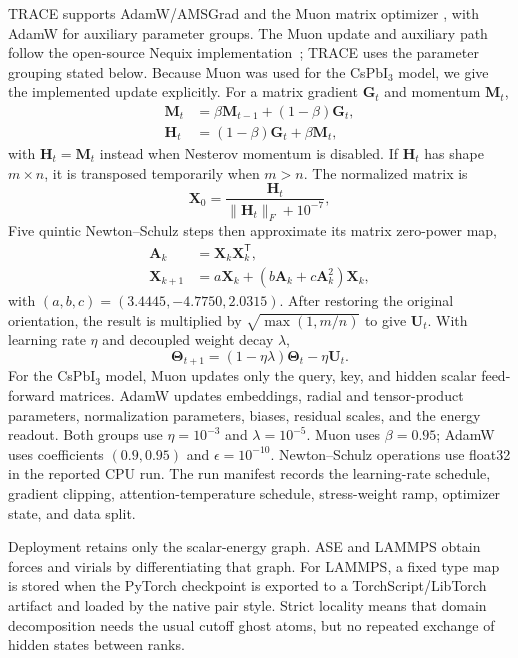 \documentclass[aps,prx,preprint,notitlepage,superscriptaddress,nofootinbib,floatfix]{revtex4-2}
\newcommand{\vect}[1]{\bm{#1}}
\begin{document}
TRACE supports AdamW/AMSGrad and the Muon matrix optimizer
\cite{jordan2024muon}, with AdamW for auxiliary parameter groups. The Muon
update and auxiliary path follow the open-source Nequix implementation~\cite{koker2025nequix}; TRACE uses the parameter grouping stated below. Because Muon was used for the CsPbI$_3$ model, we give
the implemented update explicitly. For a matrix gradient $\vect G_t$ and
momentum $\vect M_t$,
\begin{align}
 \vect M_t&=\beta\vect M_{t-1}+(1-\beta)\vect G_t,\\
 \vect H_t&=(1-\beta)\vect G_t+\beta\vect M_t,
 \label{eq:muon-momentum}
\end{align}
with $\vect H_t=\vect M_t$ instead when Nesterov momentum is
disabled. If $\vect H_t$ has shape $m\times n$, it is transposed temporarily
when $m>n$. The normalized matrix is
\begin{equation}
 \vect X_0=\frac{\vect H_t}{\lVert\vect H_t\rVert_F+10^{-7}},
 \label{eq:muon-normalization}
\end{equation}
Five quintic Newton--Schulz steps then approximate its matrix
zero-power map,
\begin{align}
 \vect A_k&=\vect X_k\vect X_k^{\mathsf T},\\
 \vect X_{k+1}&=a\vect X_k+
 (b\vect A_k+c\vect A_k^2)\vect X_k,
 \label{eq:muon-ns}
\end{align}
with $(a,b,c)=(3.4445,-4.7750,2.0315)$. After restoring the
original orientation, the result is multiplied by
$\sqrt{\max(1,m/n)}$ to give $\vect U_t$. With learning rate $\eta$ and
decoupled weight decay $\lambda$,
\begin{equation}
 \vect\Theta_{t+1}=(1-\eta\lambda)\vect\Theta_t-\eta\vect U_t.
 \label{eq:muon-update}
\end{equation}
For the CsPbI$_3$ model, Muon updates only the query, key,
and hidden scalar feed-forward matrices. AdamW updates embeddings, radial and
tensor-product parameters, normalization parameters, biases, residual scales,
and the energy readout. Both groups use $\eta=10^{-3}$ and
$\lambda=10^{-5}$. Muon uses $\beta=0.95$; AdamW uses coefficients
$(0.9,0.95)$ and $\epsilon=10^{-10}$. Newton--Schulz operations use float32 in
the reported CPU run. The run manifest records the learning-rate schedule,
gradient clipping, attention-temperature schedule, stress-weight ramp,
optimizer state, and data split.

Deployment retains only the scalar-energy graph. ASE and
LAMMPS obtain forces and virials by differentiating that graph. For LAMMPS, a
fixed type map is stored when the PyTorch checkpoint is exported to a
TorchScript/LibTorch artifact and loaded by the native pair style. Strict
locality means that domain decomposition needs the usual cutoff ghost atoms,
but no repeated exchange of hidden states between ranks.
\end{document}
